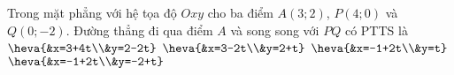 \begin{ex}%
	Trong mặt phẳng với hệ tọa độ $Oxy$ cho ba điểm $A(3;2)$, $P(4;0)$ và $Q(0;-2)$. Đường thẳng đi qua điểm $A$ và song song với $PQ$ có PTTS là
		\choice
	{$\heva{&x=3+4t\\&y=2-2t}$}
	{$\heva{&x=3-2t\\&y=2+t}$}
	{\True $\heva{&x=-1+2t\\&y=t}$}
	{$\heva{&x=-1+2t\\&y=-2+t}$}
\end{ex}


